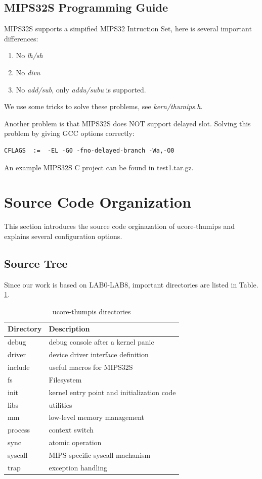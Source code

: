 \documentclass[a4paper]{article}
\begin{document}
\subsection{MIPS32S Programming Guide}
MIPS32S supports a simpified MIPS32 Intruction Set, here is several important differences:

\begin{enumerate}
\item No \emph{lh/sh}
\item No \emph{divu}
\item No \emph{add/sub}, only \emph{addu/subu} is supported.
\end{enumerate}

We use some tricks to solve these problems, see \emph{kern/thumips.h}.

Another problem is that MIPS32S does NOT support delayed slot. Solving 
this problem by giving GCC options correctly:

\begin{verbatim}
CFLAGS	:=  -EL -G0 -fno-delayed-branch -Wa,-O0
\end{verbatim}

An example MIPS32S C project can be found in test1.tar.gz.


\section{Source Code Organization}
This section introduces the source code orginazation of ucore-thumips
and explains several configuration options.
\subsection{Source Tree}
Since our work is based on LAB0-LAB8, important directories are listed in Table. \ref{tab:dir}.

\begin{table}[h]
  \centering
  \begin{tabular}{|l|l|}
    \hline
    Directory & Description \\
    \hline
    debug  &     debug console after a kernel panic \\
    driver &     device driver interface definition \\
    include &    useful macros for MIPS32S \\
    fs     &     Filesystem \\
    init   &     kernel entry point and initialization code \\
    libs   &     utilities \\
    mm     &     low-level memory management \\
    process   &  context switch             \\
    sync   &     atomic operation           \\
    syscall &     MIPS-specific syscall machanism \\
    trap   &     exception handling  \\
    \hline
  \end{tabular}
  \caption{ucore-thumpis directories}
  \label{tab:dir}
\end{table}
\end{document}
